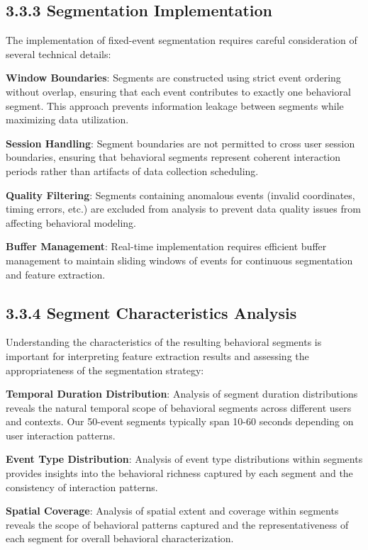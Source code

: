 \documentclass[
  12pt,
  a4paper,
]{report}
\begin{document}
\subsection{3.3.3 Segmentation
Implementation}\label{segmentation-implementation}

The implementation of fixed-event segmentation requires careful
consideration of several technical details:

\textbf{Window Boundaries}: Segments are constructed using strict event
ordering without overlap, ensuring that each event contributes to
exactly one behavioral segment. This approach prevents information
leakage between segments while maximizing data utilization.

\textbf{Session Handling}: Segment boundaries are not permitted to cross
user session boundaries, ensuring that behavioral segments represent
coherent interaction periods rather than artifacts of data collection
scheduling.

\textbf{Quality Filtering}: Segments containing anomalous events
(invalid coordinates, timing errors, etc.) are excluded from analysis to
prevent data quality issues from affecting behavioral modeling.

\textbf{Buffer Management}: Real-time implementation requires efficient
buffer management to maintain sliding windows of events for continuous
segmentation and feature extraction.

\subsection{3.3.4 Segment Characteristics
Analysis}\label{segment-characteristics-analysis}

Understanding the characteristics of the resulting behavioral segments
is important for interpreting feature extraction results and assessing
the appropriateness of the segmentation strategy:

\textbf{Temporal Duration Distribution}: Analysis of segment duration
distributions reveals the natural temporal scope of behavioral segments
across different users and contexts. Our 50-event segments typically
span 10-60 seconds depending on user interaction patterns.

\textbf{Event Type Distribution}: Analysis of event type distributions
within segments provides insights into the behavioral richness captured
by each segment and the consistency of interaction patterns.

\textbf{Spatial Coverage}: Analysis of spatial extent and coverage
within segments reveals the scope of behavioral patterns captured and
the representativeness of each segment for overall behavioral
characterization.
\end{document}
